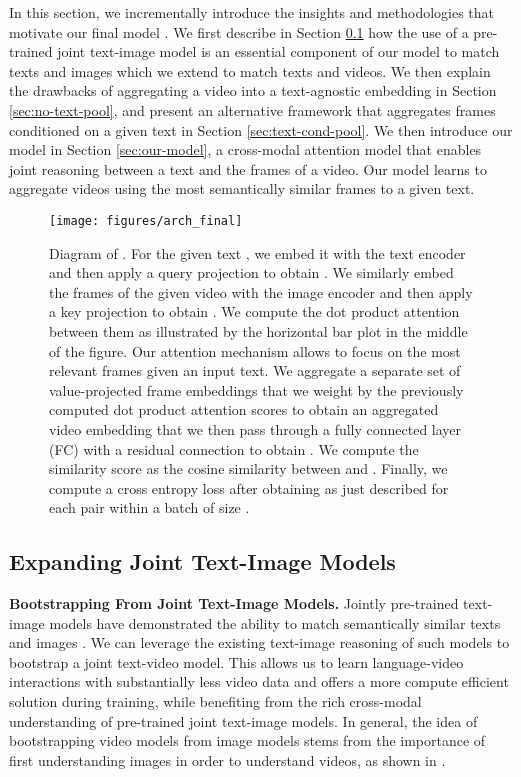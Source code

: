 \documentclass[10pt,twocolumn,letterpaper]{article}
\begin{document}
In this section, we incrementally introduce the insights and methodologies that motivate our final model \ModelName{}. We first describe in Section \ref{sec:clip} how the use of a pre-trained joint text-image model is an essential component of our model to match texts and images which we extend to match texts and videos. We then explain the drawbacks of aggregating a video into a text-agnostic embedding in Section \ref{sec:no-text-pool}, and present an alternative framework that aggregates frames conditioned on a given text in Section \ref{sec:text-cond-pool}. We then introduce our \ModelName{} model in Section \ref{sec:our-model}, a cross-modal attention model that enables joint reasoning between a text and the frames of a video. Our model learns to aggregate videos using the most semantically similar frames to a given text.

\begin{figure*}[t]\centering
           \texttt{[image: figures/arch\_final]}\\
  \caption{Diagram of \ModelName{}. For the given text , we embed it with the text encoder  and then apply a query projection to obtain . We similarly embed the frames of the given video  with the image encoder  and then apply a key projection to obtain . We compute the dot product attention between them as illustrated by the horizontal bar plot in the middle of the figure. Our attention mechanism allows \ModelName{} to focus on the most relevant frames given an input text. We aggregate a separate set of value-projected frame embeddings that we weight by the previously computed dot product attention scores to obtain an aggregated video embedding that we then pass through a fully connected layer (FC) with a residual connection to obtain . We compute the similarity score  as the cosine similarity between  and . Finally, we compute a cross entropy loss after obtaining  as just described for each pair  within a batch of size .
} 
  \label{fig:arch}
  \vskip -0.2cm
\end{figure*}

\subsection{Expanding Joint Text-Image Models}
\label{sec:clip}
\textbf{Bootstrapping From Joint Text-Image Models.} Jointly pre-trained text-image models have demonstrated the ability to match semantically similar texts and images \cite{lu2019vilbert, chen2020uniter, jia2021scaling, radford2021learning, li2021supervision, li2021align}. We can leverage the existing text-image reasoning of such models to bootstrap a joint text-video model. This allows us to learn language-video interactions with substantially less video data and offers a more compute efficient solution during training, while benefiting from the rich cross-modal understanding of pre-trained joint text-image models. In general, the idea of bootstrapping video models from image models stems from the importance of first understanding images in order to understand videos, as shown in \cite{carreira2017quo}. 
\end{document}
